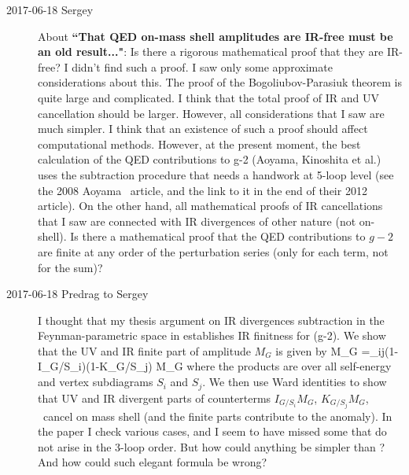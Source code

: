 \begin{description}
\item[2017-06-18 Sergey] About
\textbf{``That QED on-mass shell amplitudes are IR-free must be an old result..."}:
Is there a rigorous mathematical proof that they are IR-free? I didn't
find such a proof. I saw only some approximate considerations about this.
The proof of the Bogoliubov-Parasiuk theorem is quite large and
complicated. I think that the total proof of IR and UV cancellation
should be larger. However, all considerations that I saw are much
simpler. I think that an existence of such a proof should affect
computational methods. However, at the present moment, the best
calculation of the QED contributions to g-2 (Aoyama, Kinoshita et al.)
uses the subtraction procedure that needs a handwork at 5-loop level (see
the 2008 Aoyama \etal\ article, and the link to it in
the end of their 2012 article). On the other hand, all
mathematical proofs of IR cancellations that I saw are connected with IR
divergences of other nature (not on-shell). Is there a mathematical proof
that the QED contributions to $g-2$ are finite at any order of the
perturbation series (only for each term, not for the sum)?

\item[2017-06-18 Predrag to Sergey]
I thought that my thesis argument on IR divergences subtraction in the
Feynman-parametric space in  establishes IR finitness for
(g-2).
We show that the UV and IR finite part of amplitude $M_G$ is given by
\beq
\Delta M_G =\prod_{ij}(1-I_{G/S_i})(1-K_{G/S_j}) M_G
where the products are over all self-energy and vertex subdiagrams $S_i$
and $S_j$. We then use Ward identities to show that UV and IR
divergent parts of counterterms $I_{G/S_i} M_G$, $K_{G/S_j} M_G$, \etc\
cancel on mass shell (and the finite parts contribute to the anomaly). In
the paper I check various cases, and I seem to have missed some that do
not arise in the 3-loop order. But how could anything be simpler than
\refeq{UV-IRfiniteGcorr}? And how could such elegant formula be wrong?


\end{description}
